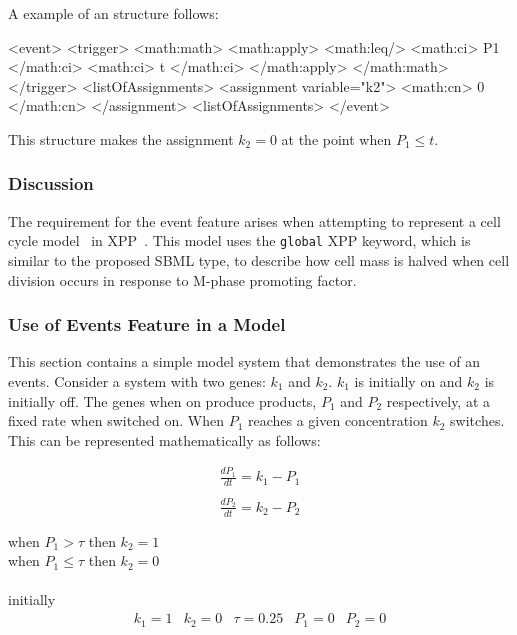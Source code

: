 \documentclass[10pt]{cekarticle}
\begin{document}
A example of an  structure follows:

\begin{example}
<event>
    <trigger>
        <math:math>
            <math:apply>
                <math:leq/>
                <math:ci> P1 </math:ci>
                <math:ci> t </math:ci>
            </math:apply>
        </math:math>
    </trigger>
    <listOfAssignments>
        <assignment variable="k2">
            <math:cn> 0 </math:cn>
        </assignment>
    <listOfAssignments>
</event>
\end{example}

This structure makes the assignment $k_2 = 0$ at the point when
$P_1 \leq t$.

\subsubsection{Discussion}
\label{sec:eventdiscuss}
The requirement for the event feature arises when attempting to represent a cell cycle model~\citep{novak:2001} in XPP~\citep{ermentrout:2001}.  This model uses the \texttt{global} XPP keyword, which is similar to the proposed SBML  type, to describe how cell mass is halved when cell division occurs in response to M-phase promoting factor.
\subsubsection{Use of Events Feature in a Model}
\label{sec:eventeg}
This section contains a simple model system that demonstrates the
use of an events.  Consider a system with two genes: $k_1$ and
$k_2$.  $k_1$ is initially on and $k_2$ is initially off.  The
genes when on produce products, $P_1$ and $P_2$ respectively, at a
fixed rate when switched on.  When $P_1$ reaches a given
concentration $k_2$ switches.  This can be represented
mathematically as follows:

\begin{equation*}
  \begin{array}{l}
    \frac{d P_1}{d t} = k_1 - P_1\\ \\[-4pt]
    \frac{d P_2}{d t} = k_2 - P_2\\ \\[-4pt]
  \end{array}
\end{equation*}
when $P_1 > \tau$ then $k_2 = 1$ \\
when $P_1 \leq \tau$ then $k_2 = 0$ \\
\\
initially
\begin{equation*}
  \begin{array}{lllll}
    k_1 = 1 & k_2 = 0 & \tau = 0.25 & P_1 = 0 & P_2 = 0\\ \\[-4pt]
  \end{array}
\end{equation*}
\end{document}
